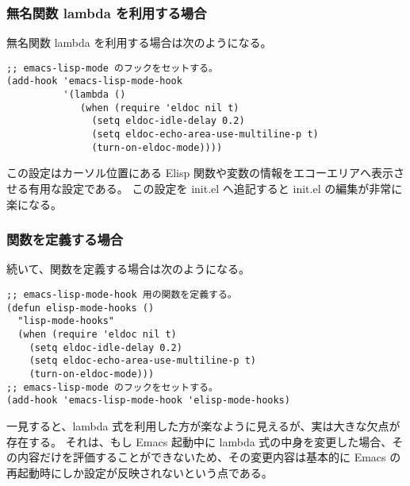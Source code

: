 \subsubsection{無名関数 lambda を利用する場合}
無名関数 lambda を利用する場合は次のようになる。
\begin{mdframed}[roundcorner=0.50zw,leftmargin=3.00zw,rightmargin=3.00zw,skipabove=0.40zw,skipbelow=0.40zw,innertopmargin=4.00pt,innerbottommargin=4.00pt,innerleftmargin=5.00pt,innerrightmargin=5.00pt,linecolor=gray!020,linewidth=0.50pt,backgroundcolor=gray!20]
\begin{verbatim}
;; emacs-lisp-mode のフックをセットする。
(add-hook 'emacs-lisp-mode-hook
          '(lambda ()
             (when (require 'eldoc nil t)
               (setq eldoc-idle-delay 0.2)
               (setq eldoc-echo-area-use-multiline-p t)
               (turn-on-eldoc-mode))))
\end{verbatim}
\end{mdframed}
この設定はカーソル位置にある Elisp 関数や変数の情報をエコーエリアへ表示させる有用な設定である。
この設定を init.el へ追記すると init.el の編集が非常に楽になる。
\subsubsection{関数を定義する場合}
続いて、関数を定義する場合は次のようになる。
\begin{mdframed}[roundcorner=0.50zw,leftmargin=3.00zw,rightmargin=3.00zw,skipabove=0.40zw,skipbelow=0.40zw,innertopmargin=4.00pt,innerbottommargin=4.00pt,innerleftmargin=5.00pt,innerrightmargin=5.00pt,linecolor=gray!020,linewidth=0.50pt,backgroundcolor=gray!20]
\begin{verbatim}
;; emacs-lisp-mode-hook 用の関数を定義する。
(defun elisp-mode-hooks ()
  "lisp-mode-hooks"
  (when (require 'eldoc nil t)
    (setq eldoc-idle-delay 0.2)
    (setq eldoc-echo-area-use-multiline-p t)
    (turn-on-eldoc-mode)))
;; emacs-lisp-mode のフックをセットする。
(add-hook 'emacs-lisp-mode-hook 'elisp-mode-hooks)
\end{verbatim}
\end{mdframed}
一見すると、lambda 式を利用した方が楽なように見えるが、実は大きな欠点が存在する。
それは、もし Emacs 起動中に lambda 式の中身を変更した場合、その内容だけを評価することができないため、その変更内容は基本的に Emacs の再起動時にしか設定が反映されないという点である。\\

